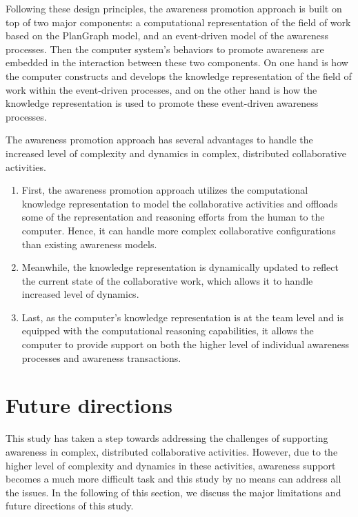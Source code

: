 Following these design principles, the awareness promotion approach is built on top of two major components: a computational representation of the field of work based on the PlanGraph model, and an event-driven model of the awareness processes. Then the computer system's behaviors to promote awareness are embedded in the interaction between these two components. On one hand is how the computer constructs and develops the knowledge representation of the field of work within the event-driven processes, and on the other hand is how the knowledge representation is used to promote these event-driven awareness processes.

The awareness promotion approach has several advantages to handle the increased level of complexity and dynamics in complex, distributed collaborative activities.

\begin{enumerate}
	\item First, the awareness promotion approach utilizes the computational knowledge representation to model the collaborative activities and offloads some of the representation and reasoning efforts from the human to the computer. Hence, it can  handle more complex collaborative configurations than existing awareness models.
	\item Meanwhile, the knowledge representation is dynamically updated to reflect the current state of the collaborative work, which allows it to handle increased level of dynamics.
	\item Last, as the computer's knowledge representation is at the team level and is equipped with the computational reasoning capabilities, it allows the computer to provide support on both the higher level of individual awareness processes and awareness transactions.
\end{enumerate}

\section{Future directions} %
\label{sec:future_directions}
This study has taken a step towards addressing the challenges of supporting awareness in complex, distributed collaborative activities. However, due to the higher level of complexity and dynamics in these activities, awareness support becomes a much more difficult task and this study by no means can address all the issues. In the following of this section, we discuss the major limitations and future directions of this study. 

